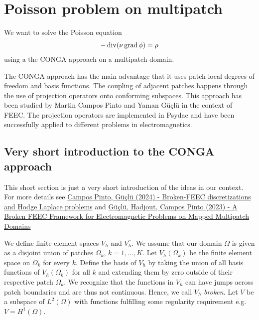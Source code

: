 \documentclass[presentation.tex]{subfiles}
\begin{document}
\section{Poisson problem on multipatch}
We want to solve the Poisson equation
\begin{align*}
    -\operatorname{div} (\nu \operatorname{grad} \phi) = \rho
\end{align*}
using a the CONGA approach on a multipatch domain. 

The CONGA approach has the main advantage that it uses patch-local 
degrees of freedom and basis functions. The coupling of adjacent patches 
happens through the use of projection operators onto conforming subspaces. 
This approach has been studied by Martin Campos Pinto and Yaman Güçlü in the context of FEEC. 
The projection operators are implemented in Psydac and 
have been successfully applied to different problems in electromagnetics. 


\subsection*{Very short introduction to the CONGA approach}
This short section is just a very short
introduction of the ideas in our context. 
For more details see \href{https://arxiv.org/abs/2109.02553}{Campos Pinto, Güçlü (2024) - Broken-FEEC discretizations and Hodge Laplace 
problems} and \href{https://link.springer.com/article/10.1007/s10915-023-02351-x}{Güçlü, 
            Hadjout, Campos Pinto (2023) - A Broken FEEC Framework for Electromagnetic Problems on Mapped Multipatch Domains}


We define finite element spaces $V_h$ and $V_h^c$. 
We assume that our domain $\Omega$ is given as a disjoint union of patches 
$\Omega_k$, $k=1, ..., K$.
Let $V_h(\Omega_k)$ be the finite element space on $\Omega_k$ for every $k$. 
Define the basis of $V_h$ by taking the union of all basis functions of $V_h(\Omega_k)$ for all $k$ and 
extending them by zero outside of their respective patch $\Omega_k$. 
We recognize that the functions in $V_h$ can have jumps across 
patch boundaries and are thus not continuous. 
Hence, we call $V_h$ \textit{broken}.
Let $V$ be a subspace of $L^2(\Omega)$ with functions fulfilling some regularity
requirement e.g. $V=H^1(\Omega)$.
\end{document}
